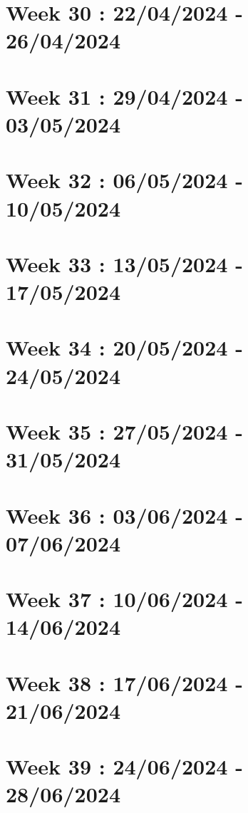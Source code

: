 \documentclass[french]{article}
\begin{document}
	\section{Week 30 : 22/04/2024 - 26/04/2024}
	

	\section{Week 31 : 29/04/2024 - 03/05/2024}
	

	\section{Week 32 : 06/05/2024 - 10/05/2024}
	

	\section{Week 33 : 13/05/2024 - 17/05/2024}
	

	\section{Week 34 : 20/05/2024 - 24/05/2024}
	

	\section{Week 35 : 27/05/2024 - 31/05/2024}
	

	\section{Week 36 : 03/06/2024 - 07/06/2024}
	

	\section{Week 37 : 10/06/2024 - 14/06/2024}
	

	\section{Week 38 : 17/06/2024 - 21/06/2024}
	

	\section{Week 39 : 24/06/2024 - 28/06/2024}
	
\end{document}

